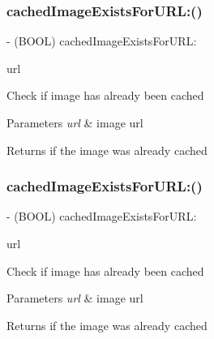 \subsubsection{\texorpdfstring{cached\+Image\+Exists\+For\+U\+R\+L\+:()}{cachedImageExistsForURL:()}\hspace{0.1cm}{\footnotesize\ttfamily [2/3]}}
{\footnotesize\ttfamily -\/ (B\+O\+OL) cached\+Image\+Exists\+For\+U\+R\+L\+: \begin{DoxyParamCaption}\item[{(N\+S\+U\+RL $\ast$)}]{url }\end{DoxyParamCaption}}

Check if image has already been cached


\begin{DoxyParams}{Parameters}
{\em url} & image url\\
\hline
\end{DoxyParams}
\begin{DoxyReturn}{Returns}
if the image was already cached 
\end{DoxyReturn}
\mbox{\label{interface_s_d_web_image_manager_a9634c36e65314e0b973056a96f6a62e2}} 
\subsubsection{\texorpdfstring{cached\+Image\+Exists\+For\+U\+R\+L\+:()}{cachedImageExistsForURL:()}\hspace{0.1cm}{\footnotesize\ttfamily [3/3]}}
{\footnotesize\ttfamily -\/ (B\+O\+OL) cached\+Image\+Exists\+For\+U\+R\+L\+: \begin{DoxyParamCaption}\item[{(N\+S\+U\+RL $\ast$)}]{url }\end{DoxyParamCaption}}

Check if image has already been cached


\begin{DoxyParams}{Parameters}
{\em url} & image url\\
\hline
\end{DoxyParams}
\begin{DoxyReturn}{Returns}
if the image was already cached 
\end{DoxyReturn}
\mbox{\label{interface_s_d_web_image_manager_a5583bb0fba17b92ce2fe9245b6ecafd2}} 
